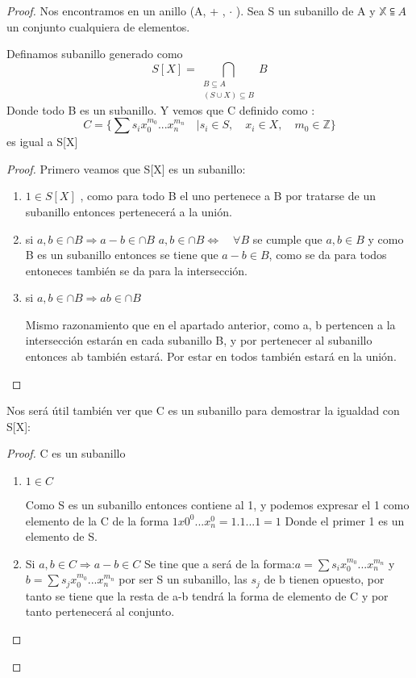 \begin{proof}
  Nos encontramos en un anillo (A, + , $\cdot$ ). Sea S un subanillo de A y $\mathds{X} \subseteqq A$ un conjunto cualquiera de elementos.

Definamos subanillo generado como
$$ S[X] = \bigcap_{ \substack{ B \subseteq  A \\ (S \cup X) \subseteq B}} B $$ Donde todo B es un subanillo.
Y vemos que C definido como :  $$ C = \{ \sum s_i x_{0}^{m_0} ...x_{n}^{m_n} \quad | s_i \in S, \quad x_i \in X,  \quad  m_0 \in \mathds{Z} \} $$ es igual a S[X]
\begin{proof}
Primero veamos que S[X] es un subanillo:
\begin{enumerate}
\item $ 1 \in S[X]$ , como para todo B el uno pertenece a B por tratarse de un subanillo entonces pertenecerá a la unión.
\item si $a,b \in \cap B \Rightarrow a-b \in \cap B$
$ a,b \in \cap B \Leftrightarrow \quad \forall B$ se cumple que $a,b \in B$ y como B es un subanillo entonces se tiene que $a-b \in B$, como se da para
todos entoneces también se da para la intersección.
\item si $a,b \in \cap B \Rightarrow ab \in \cap B$

Mismo razonamiento que en el apartado anterior, como a, b pertencen a la intersección estarán en cada subanillo B, y por pertenecer al subanillo entonces ab también estará.
Por estar en todos también estará en la unión.

\end{enumerate}
\end {proof}

Nos será útil también ver que C es un subanillo para demostrar la igualdad con S[X]:
\begin{proof}
C es un subanillo

\begin{enumerate}
\item $1 \in C$

Como S es un subanillo entonces contiene al 1, y podemos expresar el 1 como elemento de la C de la forma $1 x0^0...x_n^0 = 1.1...1 = 1$  Donde el primer 1 es un elemento de S.

\item Si $a,b \in C \Rightarrow a-b \in C $
Se tine que a será de la forma:$ a= \sum s_i x_{0}^{m_0} ...x_{n}^{m_n} $ y $b=\sum s_j x_{0}^{m_0} ...x_{n}^{m_n} $ por ser S un subanillo, las $s_j$ de b tienen opuesto, por tanto se tiene que la resta de a-b tendrá la forma de elemento de C y por tanto pertenecerá al conjunto.


\end{enumerate}
\end{proof}
\end{proof}

